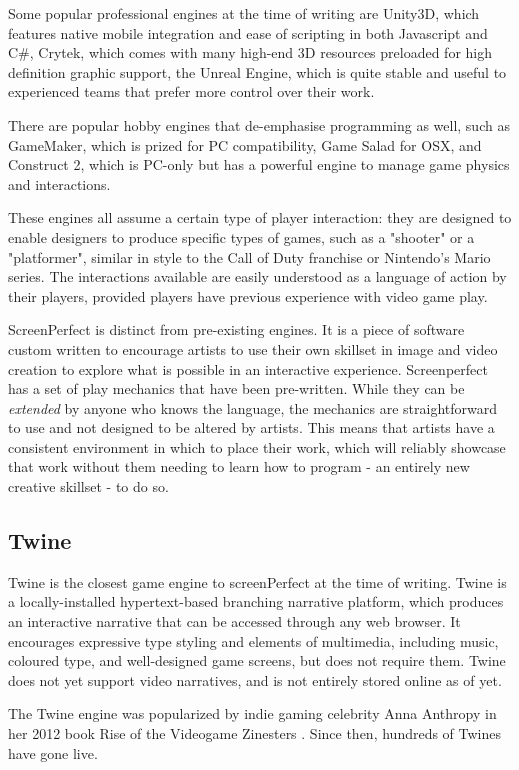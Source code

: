 Some popular professional engines at the time of writing are Unity3D, which features native mobile integration and ease of scripting in both Javascript and C#, Crytek, which comes with many high-end 3D resources preloaded for high definition graphic support, the Unreal Engine, which is quite stable and useful to experienced teams that prefer more control over their work.

There are popular hobby engines that de-emphasise programming as well, such as GameMaker, which is prized for PC compatibility, Game Salad for OSX, and Construct 2, which is PC-only but has a powerful engine to manage game physics and interactions.

These engines all assume a certain type of player interaction: they are designed to enable designers to produce specific types of games, such as a "shooter" or a "platformer", similar in style to the Call of Duty franchise or Nintendo's Mario series. The interactions available are easily understood as a language of action by their players, provided players have previous experience with video game play.

ScreenPerfect is distinct from pre-existing engines. It is a piece of software custom written to encourage artists to use their own skillset in image and video creation to explore what is possible in an interactive experience. Screenperfect has a set of play mechanics that have been pre-written. While they can be \textit{extended} by anyone who knows the \cite{daimio} language, the mechanics are straightforward to use and not designed to be altered by artists. This means that artists have a consistent environment in which to place their work, which will reliably showcase that work without them needing to learn how to program - an entirely new creative skillset - to do so.

\subsection{Twine}
Twine is the closest game engine to screenPerfect at the time of writing. Twine is a locally-installed hypertext-based branching narrative platform, which produces an interactive narrative that can be accessed through any web browser. It encourages expressive type styling and elements of multimedia, including music, coloured type, and well-designed game screens, but does not require them. Twine does not yet support video narratives, and is not entirely stored online as of yet.

The Twine engine was popularized by indie gaming celebrity Anna Anthropy in her 2012 book Rise of the Videogame Zinesters \cite[2012]{anthropy}. Since then, hundreds of Twines have gone live. 

